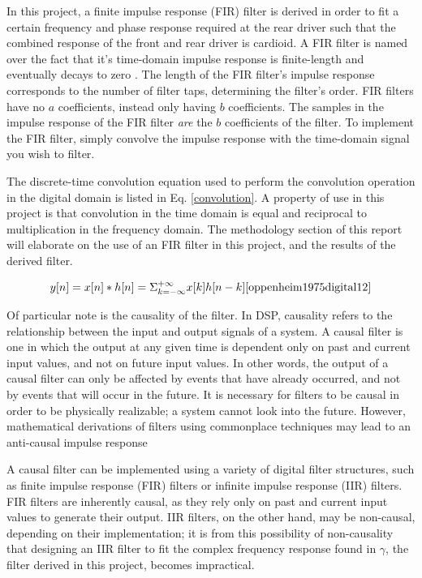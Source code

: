 \documentclass{report}
\begin{document}
        In this project, a finite impulse response (FIR) filter is derived in order to fit a certain frequency and phase response required at the rear driver such that the combined response of the front and rear driver is cardioid.
        A FIR filter is named over the fact that it's time-domain impulse response is finite-length and eventually decays to zero \cite{litwin2000fir}.
        The length of the FIR filter's impulse response corresponds to the number of filter taps, determining the filter's order.
        FIR filters have no $a$ coefficients, instead only having $b$ coefficients.
        The samples in the impulse response of the FIR filter \textit{are} the $b$ coefficients of the filter.
        To implement the FIR filter, simply convolve the impulse response with the time-domain signal you wish to filter.
        
        The discrete-time convolution equation used to perform the convolution operation in the digital domain is listed in Eq. \ref{convolution}.
        A property of use in this project is that convolution in the time domain is equal and reciprocal to multiplication in the frequency domain.
        The methodology section of this report will elaborate on the use of an FIR filter in this project, and the results of the derived filter.

        \begin{equation}
            y[n] = x[n] * h[n] = \Sigma_{k=-\infty}^{+\infty} x[k]h[n-k] \cite{oppenheim1975digital12}
            \label{convolution}
        \end{equation}

        Of particular note is the causality of the filter.
        In DSP, causality refers to the relationship between the input and output signals of a system.
        A causal filter is one in which the output at any given time is dependent only on past and current input values, and not on future input values.
        In other words, the output of a causal filter can only be affected by events that have already occurred, and not by events that will occur in the future.
        It is necessary for filters to be causal in order to be physically realizable; a system cannot look into the future.
        However, mathematical derivations of filters using commonplace techniques may lead to an anti-causal impulse response

        A causal filter can be implemented using a variety of digital filter structures, such as finite impulse response (FIR) filters or infinite impulse response (IIR) filters.
        FIR filters are inherently causal, as they rely only on past and current input values to generate their output.
        IIR filters, on the other hand, may be non-causal, depending on their implementation; it is from this possibility of non-causality that designing an IIR filter to fit the complex frequency response found in $\gamma$, the filter derived in this project, becomes impractical. 
\end{document}
